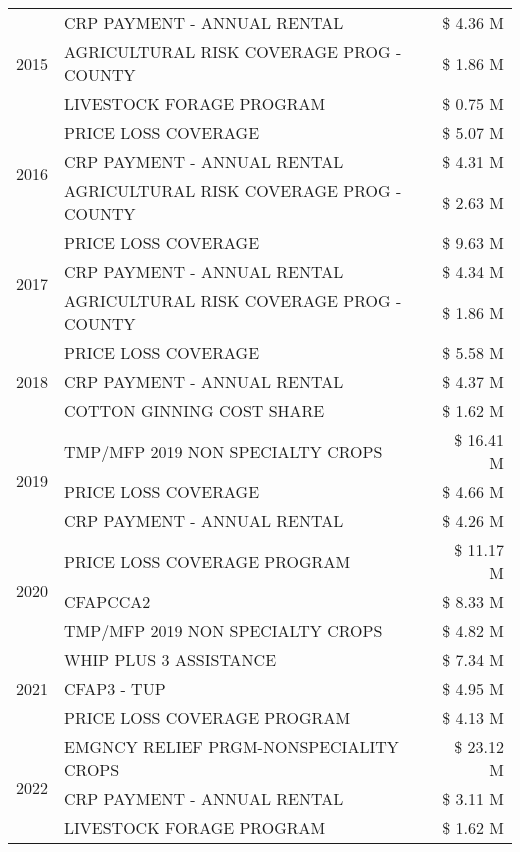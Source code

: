 \begin{tabular}{llr}
\cline{1-3}
\multirow[t]{3}{*}{2015} & CRP PAYMENT - ANNUAL RENTAL & \$ 4.36 M \\
 & AGRICULTURAL RISK COVERAGE PROG - COUNTY & \$ 1.86 M \\
 & LIVESTOCK FORAGE PROGRAM & \$ 0.75 M \\
\cline{1-3}
\multirow[t]{3}{*}{2016} & PRICE LOSS COVERAGE & \$ 5.07 M \\
 & CRP PAYMENT - ANNUAL RENTAL & \$ 4.31 M \\
 & AGRICULTURAL RISK COVERAGE PROG - COUNTY & \$ 2.63 M \\
\cline{1-3}
\multirow[t]{3}{*}{2017} & PRICE LOSS COVERAGE & \$ 9.63 M \\
 & CRP PAYMENT - ANNUAL RENTAL & \$ 4.34 M \\
 & AGRICULTURAL RISK COVERAGE PROG - COUNTY & \$ 1.86 M \\
\cline{1-3}
\multirow[t]{3}{*}{2018} & PRICE LOSS COVERAGE & \$ 5.58 M \\
 & CRP PAYMENT - ANNUAL RENTAL & \$ 4.37 M \\
 & COTTON GINNING COST SHARE & \$ 1.62 M \\
\cline{1-3}
\multirow[t]{3}{*}{2019} & TMP/MFP 2019 NON SPECIALTY CROPS & \$ 16.41 M \\
 & PRICE LOSS COVERAGE & \$ 4.66 M \\
 & CRP PAYMENT - ANNUAL RENTAL & \$ 4.26 M \\
\cline{1-3}
\multirow[t]{3}{*}{2020} & PRICE LOSS COVERAGE PROGRAM & \$ 11.17 M \\
 & CFAPCCA2 & \$ 8.33 M \\
 & TMP/MFP 2019 NON SPECIALTY CROPS & \$ 4.82 M \\
\cline{1-3}
\multirow[t]{3}{*}{2021} & WHIP PLUS 3 ASSISTANCE & \$ 7.34 M \\
 & CFAP3 - TUP & \$ 4.95 M \\
 & PRICE LOSS COVERAGE PROGRAM & \$ 4.13 M \\
\cline{1-3}
\multirow[t]{3}{*}{2022} & EMGNCY RELIEF PRGM-NONSPECIALITY CROPS & \$ 23.12 M \\
 & CRP PAYMENT - ANNUAL RENTAL & \$ 3.11 M \\
 & LIVESTOCK FORAGE PROGRAM & \$ 1.62 M \\
\cline{1-3}
\bottomrule
\end{tabular}
